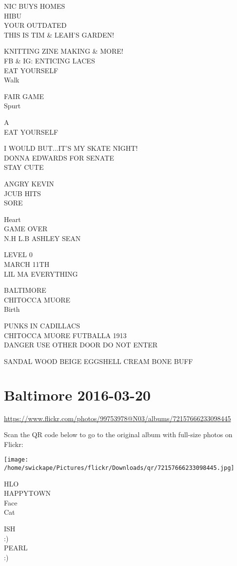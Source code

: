 \documentclass[10pt,letterpaper]{article}
\begin{document}
NIC BUYS HOMES\\
HIBU\\
YOUR OUTDATED\\
THIS IS TIM \& LEAH'S GARDEN!

KNITTING ZINE MAKING \& MORE!\\
FB \& IG: ENTICING LACES\\
EAT YOURSELF\\
Walk

FAIR GAME\\
Spurt

A\\
EAT YOURSELF

I WOULD BUT...IT'S MY SKATE NIGHT!\\
DONNA EDWARDS FOR SENATE\\
STAY CUTE

ANGRY KEVIN\\
JCUB HITS\\
SORE

Heart\\
GAME OVER\\
N.H L.B ASHLEY SEAN

LEVEL 0\\
MARCH 11TH\\
LIL MA EVERYTHING

BALTIMORE\\
CHITOCCA MUORE\\
Birth

PUNKS IN CADILLACS\\
CHITOCCA MUORE FUTBALLA 1913\\
DANGER USE OTHER DOOR DO NOT ENTER

SANDAL WOOD BEIGE EGGSHELL CREAM BONE BUFF


\section*{Baltimore 2016-03-20}

\url{https://www.flickr.com/photos/99753978@N03/albums/72157666233098445}

Scan the QR code below to go to the original album with full-size photos on Flickr:

\texttt{[image: /home/swickape/Pictures/flickr/Downloads/qr/72157666233098445.jpg]}


HLO\\
HAPPYTOWN\\
Face\\
Cat

ISH\\
:)\\
PEARL\\
:)
\end{document}
